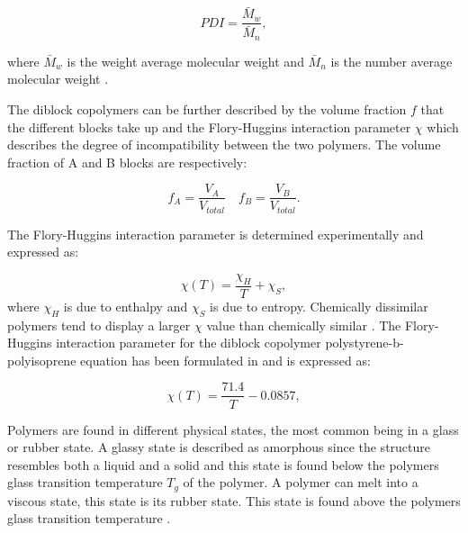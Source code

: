 \documentclass[MasterThesisMain.tex]{subfiles}
\begin{document}
\begin{equation}
PDI = \frac{\bar{M}_w}{\bar{M}_n},
\end{equation} 

where $\bar{M}_w$ is the weight average molecular weight and $\bar{M}_n$ is the number average molecular weight \cite{strobl2007physics}.

The diblock copolymers can be further described by the volume fraction $f$ that the different blocks take up and the Flory-Huggins interaction parameter $\chi$ which describes the degree of incompatibility between the two polymers. The volume fraction of A and B blocks are respectively:

\begin{equation}
f_A = \frac{V_A}{V_{total}} \quad f_B=\frac{V_B}{V_{total}}.
\end{equation}

The Flory-Huggins interaction parameter is determined experimentally and expressed as:

\begin{equation}
\chi(T) = \frac{\chi_H}{T} + \chi_S,
\end{equation} 
where $\chi_H$ is due to enthalpy and $\chi_S$ is due to entropy. Chemically dissimilar polymers tend to display a larger $\chi$ value than chemically similar \cite{BCPthermo}\cite{FHpolymer}. The Flory-Huggins interaction parameter for the diblock copolymer polystyrene-b-polyisoprene equation has been formulated in \cite{calchi} and is expressed as:

\begin{equation}
\chi(T) = \frac{71.4}{T} -0.0857,
\end{equation}

Polymers are found in different physical states, the most common being in a glass or rubber state. A glassy state is described as amorphous since the structure resembles both a liquid and a solid and this state is found below the polymers glass transition temperature $T_g$ of the polymer. A polymer can melt into a viscous state, this state is its rubber state. This state is found above the polymers glass transition temperature \cite{petty2008molecular}. 
\end{document}
